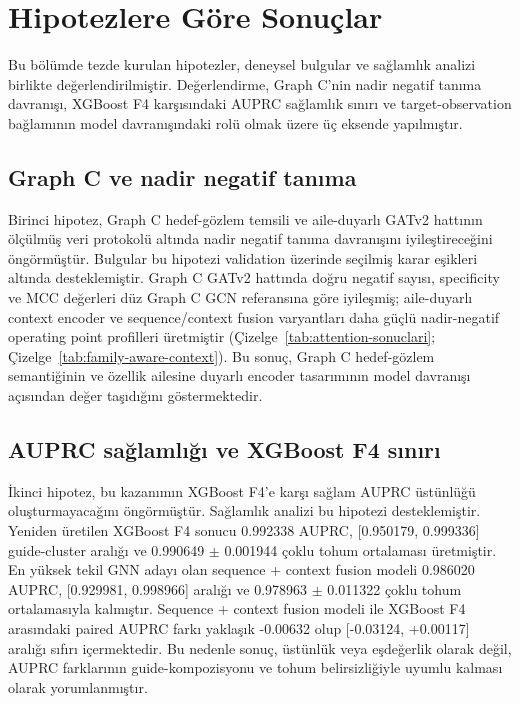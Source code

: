 \section{Hipotezlere Göre Sonuçlar}

Bu bölümde tezde kurulan hipotezler, deneysel bulgular ve sağlamlık analizi birlikte değerlendirilmiştir. Değerlendirme, Graph C'nin nadir negatif tanıma davranışı, XGBoost F4 karşısındaki AUPRC sağlamlık sınırı ve target-observation bağlamının model davranışındaki rolü olmak üzere üç eksende yapılmıştır.

\subsection{Graph C ve nadir negatif tanıma}

Birinci hipotez, Graph C hedef-gözlem temsili ve aile-duyarlı GATv2 hattının ölçülmüş veri protokolü altında nadir negatif tanıma davranışını iyileştireceğini öngörmüştür. Bulgular bu hipotezi validation üzerinde seçilmiş karar eşikleri altında desteklemiştir. Graph C GATv2 hattında doğru negatif sayısı, specificity ve MCC değerleri düz Graph C GCN referansına göre iyileşmiş; aile-duyarlı context encoder ve sequence/context fusion varyantları daha güçlü nadir-negatif operating point profilleri üretmiştir (Çizelge~\ref{tab:attention-sonuclari}; Çizelge~\ref{tab:family-aware-context}). Bu sonuç, Graph C hedef-gözlem semantiğinin ve özellik ailesine duyarlı encoder tasarımının model davranışı açısından değer taşıdığını göstermektedir.

\subsection{AUPRC sağlamlığı ve XGBoost F4 sınırı}

İkinci hipotez, bu kazanımın XGBoost F4'e karşı sağlam AUPRC üstünlüğü oluşturmayacağını öngörmüştür. Sağlamlık analizi bu hipotezi desteklemiştir. Yeniden üretilen XGBoost F4 sonucu 0.992338 AUPRC, [0.950179, 0.999336] guide-cluster aralığı ve 0.990649 $\pm$ 0.001944 çoklu tohum ortalaması üretmiştir. En yüksek tekil GNN adayı olan sequence + context fusion modeli 0.986020 AUPRC, [0.929981, 0.998966] aralığı ve 0.978963 $\pm$ 0.011322 çoklu tohum ortalamasıyla kalmıştır. Sequence + context fusion modeli ile XGBoost F4 arasındaki paired AUPRC farkı yaklaşık -0.00632 olup [-0.03124, +0.00117] aralığı sıfırı içermektedir. Bu nedenle sonuç, üstünlük veya eşdeğerlik olarak değil, AUPRC farklarının guide-kompozisyonu ve tohum belirsizliğiyle uyumlu kalması olarak yorumlanmıştır.

